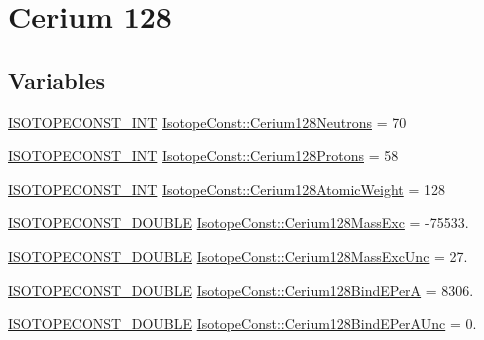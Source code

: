 \hypertarget{group___isotope_const-_cerium-_ce128}{}\section{Cerium 128}
\label{group___isotope_const-_cerium-_ce128}
\subsection*{Variables}
\begin{DoxyCompactItemize}
\item 
\mbox{\hyperlink{group___isotope_const-_macros_ga5f18360b3e99483a35c32d789e62621c}{I\+S\+O\+T\+O\+P\+E\+C\+O\+N\+S\+T\+\_\+\+I\+NT}} \mbox{\hyperlink{group___isotope_const-_cerium-_ce128_ga928458304640fffc143570f909731961}{Isotope\+Const\+::\+Cerium128\+Neutrons}} = 70
\item 
\mbox{\hyperlink{group___isotope_const-_macros_ga5f18360b3e99483a35c32d789e62621c}{I\+S\+O\+T\+O\+P\+E\+C\+O\+N\+S\+T\+\_\+\+I\+NT}} \mbox{\hyperlink{group___isotope_const-_cerium-_ce128_gac87825c4d25452a36bcb79433bed06ce}{Isotope\+Const\+::\+Cerium128\+Protons}} = 58
\item 
\mbox{\hyperlink{group___isotope_const-_macros_ga5f18360b3e99483a35c32d789e62621c}{I\+S\+O\+T\+O\+P\+E\+C\+O\+N\+S\+T\+\_\+\+I\+NT}} \mbox{\hyperlink{group___isotope_const-_cerium-_ce128_ga3515c28111ff5c08f99e6a723868fe99}{Isotope\+Const\+::\+Cerium128\+Atomic\+Weight}} = 128
\item 
\mbox{\hyperlink{group___isotope_const-_macros_ga8f45a7272ce02c0b4c65c44636ed719a}{I\+S\+O\+T\+O\+P\+E\+C\+O\+N\+S\+T\+\_\+\+D\+O\+U\+B\+LE}} \mbox{\hyperlink{group___isotope_const-_cerium-_ce128_ga77b3c627c266f37a99aa237b679ea11e}{Isotope\+Const\+::\+Cerium128\+Mass\+Exc}} = -\/75533.
\item 
\mbox{\hyperlink{group___isotope_const-_macros_ga8f45a7272ce02c0b4c65c44636ed719a}{I\+S\+O\+T\+O\+P\+E\+C\+O\+N\+S\+T\+\_\+\+D\+O\+U\+B\+LE}} \mbox{\hyperlink{group___isotope_const-_cerium-_ce128_ga766863054eff84b7ddb4eb1d6d54c265}{Isotope\+Const\+::\+Cerium128\+Mass\+Exc\+Unc}} = 27.
\item 
\mbox{\hyperlink{group___isotope_const-_macros_ga8f45a7272ce02c0b4c65c44636ed719a}{I\+S\+O\+T\+O\+P\+E\+C\+O\+N\+S\+T\+\_\+\+D\+O\+U\+B\+LE}} \mbox{\hyperlink{group___isotope_const-_cerium-_ce128_gab31a071e0921bcecf4c0958a76bd11d5}{Isotope\+Const\+::\+Cerium128\+Bind\+E\+PerA}} = 8306.
\item 
\mbox{\hyperlink{group___isotope_const-_macros_ga8f45a7272ce02c0b4c65c44636ed719a}{I\+S\+O\+T\+O\+P\+E\+C\+O\+N\+S\+T\+\_\+\+D\+O\+U\+B\+LE}} \mbox{\hyperlink{group___isotope_const-_cerium-_ce128_gae3ad55e8dd8b1f38f93ac9d35d3fc998}{Isotope\+Const\+::\+Cerium128\+Bind\+E\+Per\+A\+Unc}} = 0.

\end{DoxyCompactItemize}
